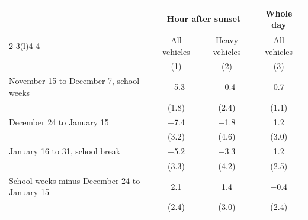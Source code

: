 \begin{tabular}{@{}l ccc@{}}
\toprule
 & \multicolumn{2}{c}{Hour after sunset} & Whole day \\
\cmidrule(lr){2-3}\cmidrule(l){4-4}
 & All vehicles & Heavy vehicles & All vehicles \\
 & (1) & (2) & (3) \\
\midrule
November 15 to December 7, school weeks & $-$5.3 & $-$0.4 & 0.7 \\
 & (1.8) & (2.4) & (1.1) \\
December 24 to January 15 & $-$7.4 & $-$1.8 & 1.2 \\
 & (3.2) & (4.6) & (3.0) \\
January 16 to 31, school break & $-$5.2 & $-$3.3 & 1.2 \\
 & (3.3) & (4.2) & (2.5) \\
School weeks minus December 24 to January 15 & 2.1 & 1.4 & $-$0.4 \\
 & (2.4) & (3.0) & (2.4) \\
\bottomrule
\end{tabular}
